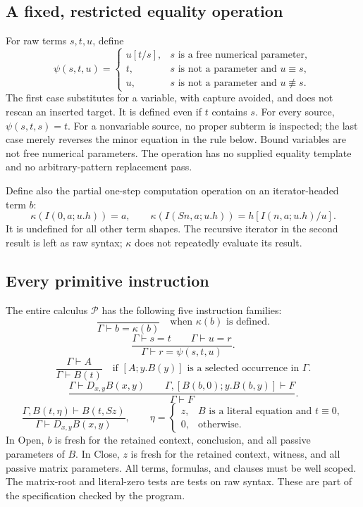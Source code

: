 \subsection{A fixed, restricted equality operation}

For raw terms $s,t,u$, define
\[
 \psi(s,t,u)=
 \begin{cases}
 u[t/s],&s\text{ is a free numerical parameter},\\
 t,&s\text{ is not a parameter and }u\equiv s,\\
 u,&s\text{ is not a parameter and }u\not\equiv s.
 \end{cases}
\]
The first case substitutes for a variable, with capture avoided, and does
not rescan an inserted target.  It is defined even if $t$ contains $s$.
For every source, $\psi(s,t,s)=t$.  For a nonvariable source, no proper
subterm is inspected; the last case merely reverses the minor equation
in the rule below.  Bound variables are not free numerical parameters.
The operation has no supplied equality template and no arbitrary-pattern
replacement pass.

Define also the partial one-step computation operation on an
iterator-headed term $b$:
\[
 \kappa(I(0,a;u.h))=a,\qquad
 \kappa(I(Sn,a;u.h))=h[I(n,a;u.h)/u].
\]
It is undefined for all other term shapes.  The recursive iterator in
the second result is left as raw syntax; $\kappa$ does not repeatedly
evaluate its result.

\subsection{Every primitive instruction}

The entire calculus $\mathcal P$ has the following five instruction
families:
\[
 \frac{}{\Gamma\vdash b=\kappa(b)}
 \quad\text{when }\kappa(b)\text{ is defined}.
 \tag{Compute}\label{rule:rp-compute}
\]
\[
 \frac{\Gamma\vdash s=t\qquad\Gamma\vdash u=r}
      {\Gamma\vdash r=\psi(s,t,u)}.
 \tag{Param}\label{rule:rp-param}
\]
\[
 \frac{\Gamma\vdash A}{\Gamma\vdash B(t)}
 \quad\text{if }[A;y.B(y)]\text{ is a selected occurrence in }\Gamma.
 \tag{Use}\label{rule:rp-use}
\]
\[
 \frac{\Gamma\vdash D_{x,y}B(x,y)\qquad
       \Gamma,[B(b,0);y.B(b,y)]\vdash F}
      {\Gamma\vdash F}.
 \tag{Open}\label{rule:rp-open}
\]
\[
 \frac{\Gamma,B(t,\eta)\vdash B(t,Sz)}
      {\Gamma\vdash D_{x,y}B(x,y)},\qquad
 \eta=\begin{cases}
 z,&B\text{ is a literal equation and }t\equiv0,\\
 0,&\text{otherwise}.
 \end{cases}
 \tag{Close}\label{rule:rp-close}
\]
In Open, $b$ is fresh for the retained context, conclusion, and all passive
parameters of $B$.  In Close, $z$ is fresh for the retained context,
witness, and all passive matrix parameters.  All terms, formulas, and
clauses must be well scoped.  The matrix-root and literal-zero tests are
tests on raw syntax.  These are part of the specification checked by the
program.

